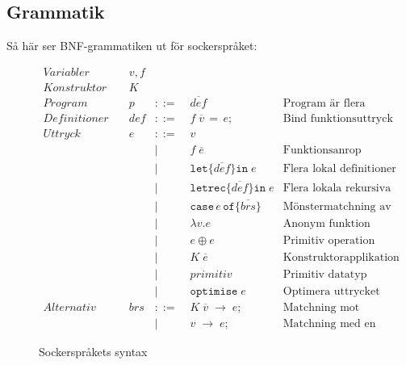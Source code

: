 \documentclass[Rapport]{subfiles}
\begin{document}
\subsection{Grammatik}

Så här ser BNF-grammatiken ut för sockerspråket:

\begin{figure}[H]
\begin{equation*}
\begin{aligned}
Variabler \quad & v,f \\
Konstruktor \quad & K \\
Program \quad& p &::=&\; \overline{def} 
        & \text{Program är flera definitioner}\\ 
Definitioner  \quad & def & ::=&\; f \; \overline{v} \, \mathtt{=} \, e \mathtt{;} 
        & \text {Bind funktionsuttryck}\\
Uttryck \quad & e &::=&\;  v \\
       &&|&\; f \; \overline{e}  
            & \text{Funktionsanrop} \\ 
       &&|&\; \mathtt{let \{} \overline{def} \mathtt{\} in }\; e 
            & \text{Flera lokal definitioner}\\
       &&|&\; \mathtt{letrec \{} \overline{def} \mathtt{\} in} \; e 
            & \text{Flera lokala rekursiva definitioner} \\
       &&|&\; \mathtt{case} \, e \, \mathtt{of \{} \overline{brs} \mathtt{\}} 
            & \text{Mönstermatchning av uttryck} \\
       &&|&\; \mathtt{\lambda } v \mathtt{.} e
            & \text{Anonym funktion} \\
       &&|&\; e \oplus e 
            & \text{Primitiv operation}\\ 
       &&|&\; K \; \overline{e} 
            & \text{Konstruktorapplikation} \\
       &&|&\; primitiv 
            & \text{Primitiv datatyp} \\
       &&|&\; \mathtt{optimise} \; e 
            & \text{Optimera uttrycket} \\
Alternativ \quad & brs &::=&\; K \; \overline{v} \; \mathtt{\rightarrow} \; e \mathtt{;} 
            & \text{Matchning mot konstruktor} \\
         &&|&\; v \; \mathtt{\rightarrow} \; e \mathtt{;}
            & \text{Matchning med en variabel}
\end{aligned}
\end{equation*}
\caption{Sockerspråkets syntax}
\end{figure}
\end{document}
